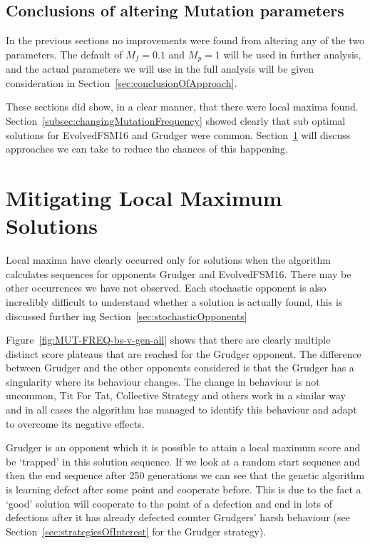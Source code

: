 
\subsection{Conclusions of altering Mutation parameters}
In the previous sections no improvements were found from altering any of the two parameters. 
The default of $M_f=0.1$ and $M_p=1$ will be used in further analysis, and the actual parameters we will use in the full analysis will be given consideration in Section~\ref{sec:conclusionOfApproach}.

These sections did show, in a clear manner, that there were local maxima found. 
Section~\ref{subsec:changingMutationFrequency} showed clearly that sub optimal solutions for EvolvedFSM16 and Grudger were common.
Section~\ref{sec:mitigatingLocalMaximums} will discuss approaches we can take to reduce the chances of this happening.

\section{Mitigating Local Maximum Solutions}\label{sec:mitigatingLocalMaximums}
Local maxima have clearly occurred only for solutions when the algorithm calculates sequences for opponents Grudger and EvolvedFSM16.
There may be other occurrences we have not observed.
Each stochastic opponent is also incredibly difficult to understand whether a solution is actually found, this is discussed further ing Section~\ref{sec:stochasticOpponents}


Figure~\ref{fig:MUT-FREQ-bs-v-gen-all} shows that there are clearly multiple distinct score plateaus that are reached for the Grudger opponent.
The difference between Grudger and the other opponents considered is that the Grudger has a singularity where its behaviour changes.
The change in behaviour is not uncommon, Tit For Tat, Collective Strategy and others work in a similar way and in all cases the algorithm has managed to identify this behaviour and adapt to overcome its negative effects.

Grudger is an opponent which it is possible to attain a local maximum score and be `trapped' in this solution sequence.
If we look at a random start sequence and then the end sequence after 250 generations we can see that the genetic algorithm is learning defect after some point and cooperate before.
This is due to the fact a `good' solution will cooperate to the point of a defection and end in lots of defections after it has already defected counter Grudgers' harsh behaviour (see Section~\ref{sec:strategiesOfInterest} for the Grudger strategy).

